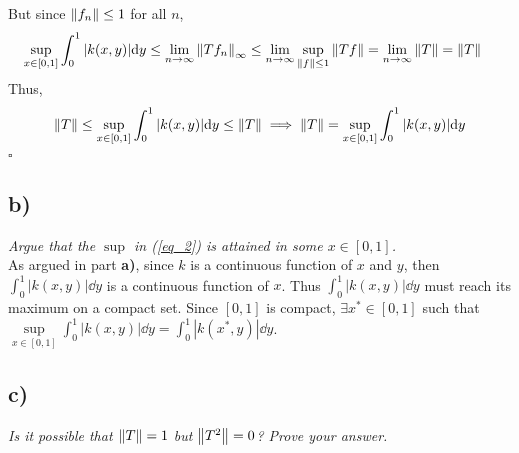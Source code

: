 \documentclass[12pt]{article}
\theoremstyle{plain}
\begin{document}
But since $\norm{f_n} \leq 1$ for all $n$,
\begin{align*}
    \sup_{x\in[0,1]}\int_0^1 |k(x,y)| \dd y &\leq \lim_{n\rightarrow\infty} \norm{Tf_n}_\infty \leq \lim_{n\rightarrow\infty}\sup\limits_{\norm{f}\leq 1} \norm{Tf} = \lim_{n\rightarrow\infty}\norm{T} = \norm{T}
\end{align*}
Thus,
\begin{align*}
    \norm{T} \leq \sup\limits_{x\in[0,1]}\int_0^1 |k(x,y)|\dd y \leq \norm{T} \implies \norm{T} = \sup\limits_{x\in[0,1]}\int_0^1 |k(x,y)|\dd y
\end{align*}
\hfill $\square$

\subsection*{ b)}
\emph{Argue that the $\sup$ in \emph{(\ref{eq_2})} is attained in some $x \in [0,1]$.} \\

As argued in part \textbf{a)}, since $k$ is a continuous function of $x$ and $y$, then $\int_0^1 |k(x,y)| \dd y$ is a continuous function of $x$.  Thus $\int_0^1 |k(x,y)| \dd y$ must reach its maximum on a compact set.  Since $[0,1]$ is compact, $\exists x^* \in [0,1]$ such that $\sup\limits_{x\in[0,1]}\int_0^1 |k(x,y)|\dd y = \int_0^1 |k(x^*,y)| \dd y$.

\subsection*{ c)}
\emph{Is it possible that $\norm{T} = 1$ but $\norm{T^2} = 0$?  Prove your answer.} \\
\end{document}
